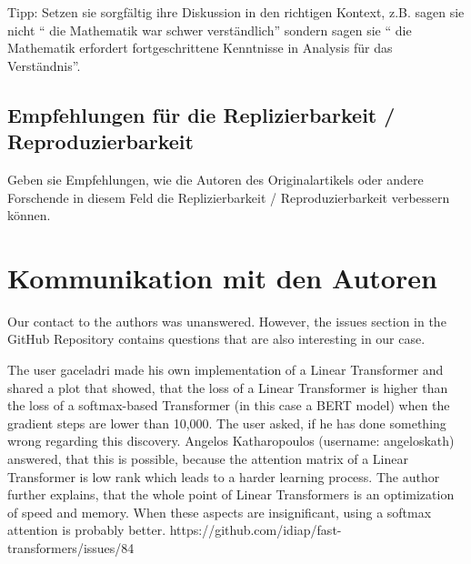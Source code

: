 \documentclass[DIV=13,fontsize=11pt]{scrartcl}
\begin{document}

Tipp: Setzen sie sorgfältig ihre Diskussion in den richtigen Kontext, z.B. sagen sie nicht `` die Mathematik war schwer verständlich'' sondern sagen sie `` die Mathematik erfordert fortgeschrittene Kenntnisse in Analysis für das Verständnis''.


\subsection{Empfehlungen für die Replizierbarkeit / Reproduzierbarkeit}
Geben sie Empfehlungen, wie die Autoren des Originalartikels oder andere Forschende in diesem Feld die Replizierbarkeit / Reproduzierbarkeit verbessern können.


\section{Kommunikation mit den Autoren}
Our contact to the authors was unanswered. However, the issues section in the GitHub Repository contains questions that are also interesting in our case.

The user gaceladri made his own implementation of a Linear Transformer and shared a plot that showed, that the loss of a Linear Transformer is higher than the loss of a softmax-based Transformer (in this case a BERT model) when the gradient steps are lower than 10,000.  The user asked, if he has done something wrong regarding this discovery. Angelos Katharopoulos (username: angeloskath) answered, that this is possible, because the attention matrix of a Linear Transformer is low rank which leads to a harder learning process. The author further explains, that the whole point of Linear Transformers is an optimization of speed and memory. When these aspects are insignificant, using a softmax attention is probably better. 
https://github.com/idiap/fast-transformers/issues/84
\end{document}
